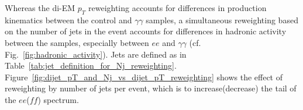 \documentclass[dissertation.tex]{subfiles}
\begin{document}
Whereas the di-EM $p_{T}$ reweighting accounts for differences in production kinematics between the control and $\gamma\gamma$ samples, a simultaneous reweighting based on the number of jets in the event accounts for differences in hadronic activity between the samples, especially between $ee$ and $\gamma\gamma$ (cf. Fig.~\ref{fig:hadronic_activity}).  Jets are defined as in Table~\ref{tab:jet_definition_for_Nj_reweighting}.  Figure~\ref{fig:dijet_pT_and_Nj_vs_dijet_pT_reweighting} shows the effect of reweighting by number of jets per event, which is to increase(decrease) the tail of the $ee$($\mathit{ff}$) \MET spectrum.

\begin{figure}
	\centering
	\hspace{1cm}

\end{figure}
\end{document}
